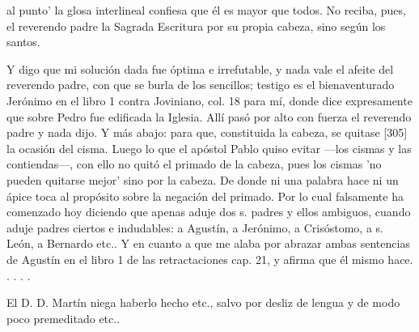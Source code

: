 al punto' la glosa interlineal confiesa que él es mayor que todos. No reciba, pues, el reverendo padre la Sagrada Escritura por su propia cabeza, sino según los santos.

Y digo que mi solución dada fue óptima e irrefutable, y nada vale el afeite del reverendo padre, con que se burla de los sencillos; testigo es el bienaventurado Jerónimo en el libro 1 contra Joviniano, col. 18 para mí, donde dice expresamente que sobre Pedro fue edificada la Iglesia. Allí pasó por alto con fuerza el reverendo padre y nada dijo. Y más abajo: para que, constituida la cabeza, se quitase [305] la ocasión del cisma. Luego lo que el apóstol Pablo quiso evitar —los cismas y las contiendas—, con ello no quitó el primado de la cabeza, pues los cismas 'no pueden quitarse mejor' sino por la cabeza. De donde ni una palabra hace ni un ápice toca al propósito sobre la negación del primado. Por lo cual falsamente ha comenzado hoy diciendo que apenas aduje dos s. padres y ellos ambiguos, cuando aduje padres ciertos e indudables: a Agustín, a Jerónimo, a Crisóstomo, a s. León, a Bernardo etc.. Y en cuanto a que me alaba por abrazar ambas sentencias de Agustín en el libro 1 de las retractaciones cap. 21, y afirma que él mismo hace. . . . .

El D. D. Martín niega haberlo hecho etc., salvo por desliz de lengua y de modo poco premeditado etc..

